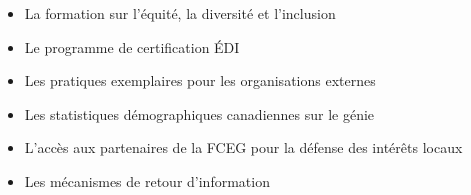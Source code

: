 \begin{itemize}
 \begin{itemize}
  \item La formation sur l'équité, la diversité et l'inclusion
  \item Le programme de certification ÉDI
  \item Les pratiques exemplaires pour les organisations externes
  \item Les statistiques démographiques canadiennes sur le génie
  \item L'accès aux partenaires de la FCEG pour la défense des intérêts locaux
  \item Les mécanismes de retour d'information
 \end{itemize}
\end{itemize}

\newpage

